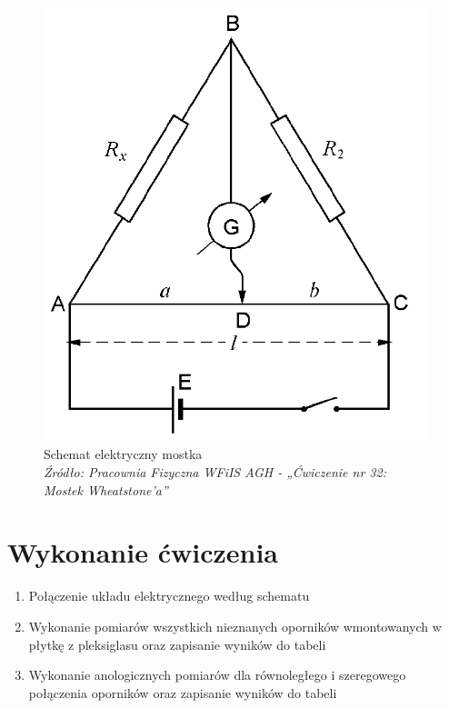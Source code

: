 \documentclass[a4paper,12pts]{article}
\begin{document}
	\begin{figure}[!h]
		\centering
		\includegraphics[scale=0.2]{schemat}
		\caption{Schemat elektryczny mostka \\ \textit{Źródło: Pracownia Fizyczna WFiIS AGH - „Ćwiczenie nr 32: Mostek Wheatstone'a”} }
		\label{schematUkladu}
	\end{figure}
	

	\newpage
	\section{Wykonanie ćwiczenia}
	
	\begin{enumerate}
		\item Połączenie układu elektrycznego według schematu
		\item Wykonanie pomiarów wszystkich nieznanych oporników wmontowanych w płytkę z pleksiglasu oraz zapisanie wyników do tabeli
		\item Wykonanie anologicznych pomiarów dla równoległego i szeregowego połączenia oporników oraz zapisanie wyników do tabeli
	\end{enumerate}
\end{document}
